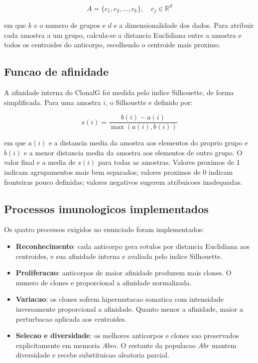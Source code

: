 \documentclass[12pt,a4paper]{article}
\begin{document}
\[
A = \{c_1, c_2, \ldots, c_k\}, \quad c_j \in \mathbb{R}^d
\]

em que \(k\) e o numero de grupos e \(d\) e a dimensionalidade dos dados. Para atribuir cada amostra a um grupo, calcula-se a distancia Euclidiana entre a amostra e todos os centroides do anticorpo, escolhendo o centroide mais proximo.

\subsection{Funcao de afinidade}
A afinidade interna do ClonalG foi medida pelo indice Silhouette, de forma simplificada. Para uma amostra \(i\), o Silhouette e definido por:

\[
s(i) = \frac{b(i) - a(i)}{\max(a(i), b(i))}
\]

em que \(a(i)\) e a distancia media da amostra aos elementos do proprio grupo e \(b(i)\) e a menor distancia media da amostra aos elementos de outro grupo. O valor final e a media de \(s(i)\) para todas as amostras. Valores proximos de 1 indicam agrupamentos mais bem separados; valores proximos de 0 indicam fronteiras pouco definidas; valores negativos sugerem atribuicoes inadequadas.

\subsection{Processos imunologicos implementados}
Os quatro processos exigidos no enunciado foram implementados:

\begin{itemize}
    \item \textbf{Reconhecimento}: cada anticorpo gera rotulos por distancia Euclidiana aos centroides, e sua afinidade interna e avaliada pelo indice Silhouette.
    \item \textbf{Proliferacao}: anticorpos de maior afinidade produzem mais clones. O numero de clones e proporcional a afinidade normalizada.
    \item \textbf{Variacao}: os clones sofrem hipermutacao somatica com intensidade inversamente proporcional a afinidade. Quanto menor a afinidade, maior a perturbacao aplicada aos centroides.
    \item \textbf{Selecao e diversidade}: os melhores anticorpos e clones sao preservados explicitamente em memoria \(Abm\). O restante da populacao \(Abr\) mantem diversidade e recebe substituicao aleatoria parcial.
\end{itemize}
\end{document}
